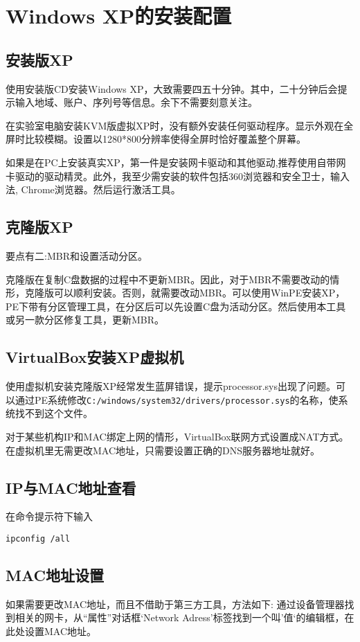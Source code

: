 \section{Windows XP的安装配置}

\subsection{安装版XP}
使用安装版CD安装Windows XP，大致需要四五十分钟。其中，二十分钟后会提示输入地域、账户、序列号等信息。余下不需要刻意关注。

在实验室电脑安装KVM版虚拟XP时，没有额外安装任何驱动程序。显示外观在全屏时比较模糊。设置以1280*800分辨率使得全屏时恰好覆盖整个屏幕。

如果是在PC上安装真实XP，第一件是安装网卡驱动和其他驱动,推荐使用自带网卡驱动的驱动精灵。此外，我至少需安装的软件包括360浏览器和安全卫士，输入法, Chrome浏览器。然后运行激活工具。

\subsection{克隆版XP}
要点有二:MBR和设置活动分区。

克隆版在复制C盘数据的过程中不更新MBR。因此，对于MBR不需要改动的情形，克隆版可以顺利安装。否则，就需要改动MBR。可以使用WinPE安装XP，PE下带有分区管理工具，在分区后可以先设置C盘为活动分区。然后使用本工具或另一款分区修复工具，更新MBR。

\subsection{VirtualBox安装XP虚拟机}
使用虚拟机安装克隆版XP经常发生蓝屏错误，提示processor.sys出现了问题。可以通过PE系统修改\verb+C:/windows/system32/drivers/processor.sys+的名称，使系统找不到这个文件。

对于某些机构IP和MAC绑定上网的情形，VirtualBox联网方式设置成NAT方式。在虚拟机里无需更改MAC地址，只需要设置正确的DNS服务器地址就好。

\subsection{IP与MAC地址查看}
在命令提示符下输入
\begin{verbatim}
ipconfig /all
\end{verbatim}

\subsection{MAC地址设置}
如果需要更改MAC地址，而且不借助于第三方工具，方法如下:
通过设备管理器找到相关的网卡，从``属性''对话框‘Network Adress’标签找到一个叫’值‘的编辑框，在此处设置MAC地址。

